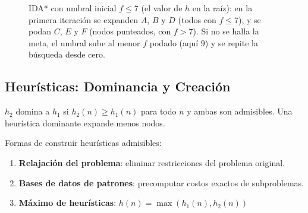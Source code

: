 \begin{figure}[H]
\centering
{}
\caption{IDA* con umbral inicial $f \leq 7$ (el valor de $h$ en la raíz): en la primera iteración se expanden $A$, $B$
y $D$ (todos con $f \leq 7$), y se podan $C$, $E$ y $F$ (nodos punteados, con $f > 7$). Si no se halla la meta, el
umbral sube al menor $f$ podado (aquí $9$) y se repite la búsqueda desde cero.}
\end{figure}

\subsection{Heurísticas: Dominancia y Creación}

\begin{definition}[Dominancia]
$h_2$ domina a $h_1$ si $h_2(n) \geq h_1(n)$ para todo $n$ y ambas son admisibles. Una heurística dominante expande menos nodos.
\end{definition}

Formas de construir heurísticas admisibles:
\begin{enumerate}
    \item \textbf{Relajación del problema}: eliminar restricciones del problema original.
    \item \textbf{Bases de datos de patrones}: precomputar costos exactos de subproblemas.
    \item \textbf{Máximo de heurísticas}: $h(n) = \max(h_1(n), h_2(n))$
\end{enumerate}

